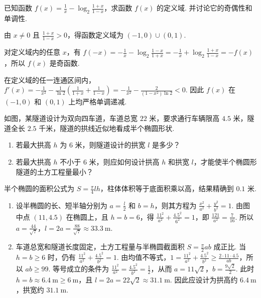 \begin{problem}
已知函数 \( f(x) = \frac{1}{x} - \log_2 \frac{1 + x}{1 - x} \)，求函数 \( f(x) \) 的定义域. 并讨论它的奇偶性和单调性.
\end{problem}

\begin{solution}
由 \(x\ne0\) 且 \(\frac{1+x}{1-x}>0\)，得函数定义域为 \((-1,0)\cup(0,1)\).

对定义域内的任意 \(x\)，有
\(f(-x)=-\frac{1}{x}-\log_2\frac{1-x}{1+x}=-\frac{1}{x}+\log_2\frac{1+x}{1-x}=-f(x)\)，所以 \(f(x)\) 是奇函数.

在定义域的任一连通区间内，\(f'(x)=-\frac{1}{x^2}-\frac{1}{\ln2}\left(\frac{1}{1+x}+\frac{1}{1-x}\right)=-\frac{1}{x^2}-\frac{2}{(1-x^2)\ln2}<0\). 因此 \(f(x)\) 在 \((-1,0)\) 和 \((0,1)\) 上均严格单调递减.
\end{solution}

\begin{problem}
如图，某隧道设计为双向四车道，车道总宽 \(22\text{ 米}\)，要求通行车辆限高 \(4.5\text{ 米}\)，隧道全长 \(2.5\text{ 千米}\)，隧道的拱线近似地看成半个椭圆形状.

\begin{enumerate}
\item 若最大拱高 \(h\) 为 \(6\text{ 米}\)，则隧道设计的拱宽 \(l\) 是多少？
\item 若最大拱高 \(h\) 不小于 \(6\text{ 米}\)，则应如何设计拱高 \(h\) 和拱宽 \(l\)，才能使半个椭圆形隧道的土方工程量最小？
\end{enumerate}

半个椭圆的面积公式为 \(S = \frac{\pi}{4}lh\)，柱体体积等于底面积乘以高，结果精确到 \(0.1\text{ 米}\).

\end{problem}

\begin{solution}
\begin{enumerate}
\item 设半椭圆的长、短半轴分别为 \(a=\frac{l}{2}\) 和 \(b=h\)，则其方程为 \(\frac{x^2}{a^2}+\frac{y^2}{b^2}=1\). 由图中点 \((11,4.5)\) 在椭圆上，且 \(h=b=6\)，得 \(\frac{11^2}{a^2}+\frac{4.5^2}{6^2}=1\)，即 \(\frac{121}{a^2}=\frac{7}{16}\). 所以 \(a=\frac{44}{\sqrt{7}}\)，\(l=2a=\frac{88}{\sqrt{7}}\approx33.3\mathrm{~m}\).
\item 车道总宽和隧道长度固定，土方工程量与半椭圆截面积 \(S=\frac{\pi}{2}ab\) 成正比. 当 \(h=b\ge6\) 时，仍有 \(\frac{11^2}{a^2}+\frac{4.5^2}{b^2}=1\). 由均值不等式，\(1=\frac{11^2}{a^2}+\frac{4.5^2}{b^2}\ge\frac{2\cdot11\cdot4.5}{ab}\)，所以 \(ab\ge99\). 等号成立的条件为 \(\frac{11^2}{a^2}=\frac{4.5^2}{b^2}=\frac{1}{2}\)，从而 \(a=11\sqrt{2}\)，\(b=\frac{9\sqrt{2}}{2}\). 此时 \(h=b\approx6.4\mathrm{~m}\ge6\mathrm{~m}\)，且 \(l=2a=22\sqrt{2}\approx31.1\mathrm{~m}\). 因此应设计为拱高约 \(6.4\mathrm{~m}\)，拱宽约 \(31.1\mathrm{~m}\).
\end{enumerate}
\end{solution}

